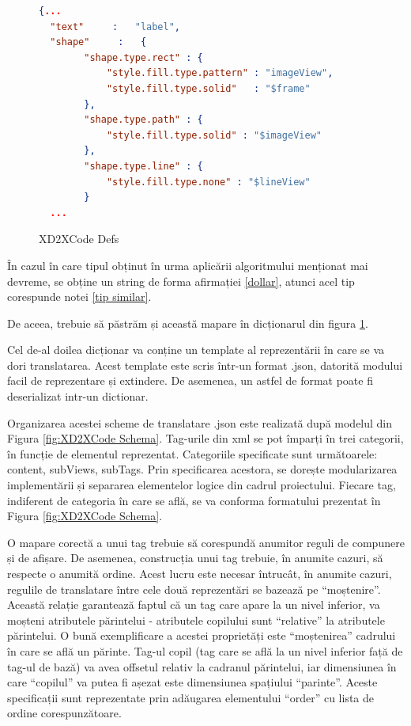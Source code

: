 \begin{figure}[!htbp]
\begin{lstlisting}[language=json,firstnumber=1]
  {...
  "text"     :   "label",
  "shape"     :   {
        "shape.type.rect" : {
            "style.fill.type.pattern" : "imageView",
            "style.fill.type.solid"   : "$frame"
        },
        "shape.type.path" : {
            "style.fill.type.solid" : "$imageView"
        },
        "shape.type.line" : {
            "style.fill.type.none" : "$lineView"
        }
  ...
\end{lstlisting}
\caption{XD2XCode Defs} \label{fig:XD2XCode Defs}
\end{figure}

În cazul în care tipul obținut în urma aplicării algoritmului menționat mai devreme, se obține un string de forma afirmației \ref{dollar}, atunci acel tip corespunde notei \ref{tip similar}.

De aceea, trebuie să păstrăm și această mapare în dicționarul din figura \ref{fig:XD2XCode Defs}.

Cel de-al doilea dicționar va conține un template al reprezentării în care se va dori translatarea. Acest template este scris într-un format .json, datorită modului facil de reprezentare și extindere. De asemenea, un astfel de format poate fi deserializat intr-un dictionar. 

Organizarea acestei scheme de translatare .json este realizată după modelul din Figura \ref{fig:XD2XCode Schema}. Tag-urile din xml se pot împarți în trei categorii, în funcție de elementul reprezentat. Categoriile specificate sunt următoarele: content, subViews, subTags. Prin specificarea acestora, se dorește modularizarea implementării și separarea elementelor logice din cadrul proiectului. Fiecare tag, indiferent de categoria în care se află, se va conforma formatului prezentat în Figura \ref{fig:XD2XCode Schema}.

O mapare corectă a unui tag trebuie să corespundă anumitor reguli de compunere și de afișare. De asemenea, construcția unui tag trebuie, în anumite cazuri, să respecte o anumită ordine. Acest lucru este necesar întrucât, în anumite cazuri, regulile de translatare între cele două reprezentări se bazează pe “moștenire”. Această relație garantează faptul că un tag care apare la un nivel inferior, va moșteni atributele părintelui - atributele copilului sunt “relative” la atributele părintelui. O bună exemplificare a acestei proprietăți este “moștenirea” cadrului în care se află un părinte. Tag-ul copil (tag care se află la un nivel inferior față de tag-ul de bază) va avea offsetul relativ la cadranul părintelui, iar dimensiunea în care “copilul” va putea fi așezat este dimensiunea spațiului “parinte”. Aceste specificații sunt reprezentate prin adăugarea elementului “order” cu lista de ordine corespunzătoare.

